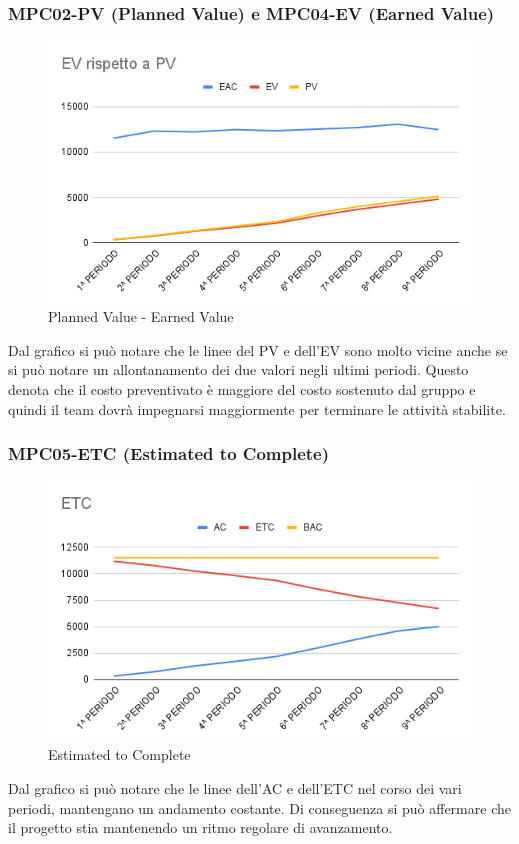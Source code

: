 \subsubsection{MPC02-PV (Planned Value) e MPC04-EV (Earned Value)}
\begin{figure}[H]
  \centering
  \includegraphics[width=0.7\linewidth]{grafici/EV_PV.png}
  \caption{Planned Value - Earned Value}
\end{figure}
Dal grafico si può notare che le linee del PV e dell'EV sono molto vicine anche se si può notare un allontanamento dei due valori negli ultimi periodi. Questo denota che il costo preventivato è maggiore del costo sostenuto dal gruppo e quindi il team dovrà impegnarsi maggiormente per terminare le attività stabilite.
\subsubsection{MPC05-ETC (Estimated to Complete)}
\begin{figure}[H]
  \centering
  \includegraphics[width=0.7\linewidth]{grafici/ETC.png}
  \caption{Estimated to Complete}
\end{figure}
Dal grafico si può notare che le linee dell'AC e dell'ETC nel corso dei vari periodi, mantengano un andamento costante. Di conseguenza si può affermare che il progetto stia mantenendo un ritmo regolare di avanzamento. 
